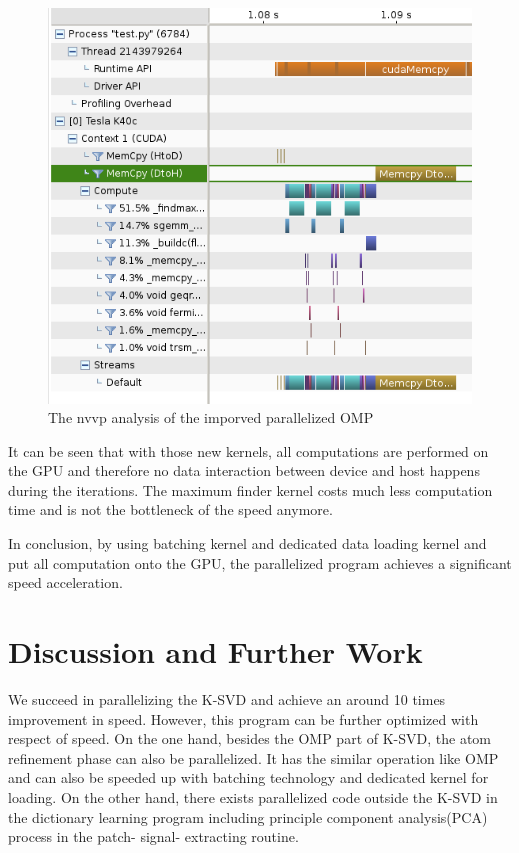 \documentclass[english]{cccconf}
\begin{document}
\begin{figure}[!htb]
	\centering
	\includegraphics[width=400pt]{5.png}
	\caption{The nvvp analysis of the imporved parallelized OMP}
	\label{figh5}
\end{figure} 

It can be seen that with those new kernels, all computations are performed on the GPU and therefore no data interaction between device and host happens during the iterations. The maximum finder kernel costs much less computation time and is not the bottleneck of the speed anymore. 

In conclusion, by using batching kernel and dedicated data loading kernel and put all computation onto the GPU, the parallelized program achieves a significant speed acceleration. 

\section{Discussion and Further Work}
We succeed in parallelizing the K-SVD and achieve an around 10 times improvement in speed. However, this program can be further optimized with respect of speed. On the one hand, besides the OMP part of K-SVD, the atom refinement phase can also be parallelized. It has the similar operation like OMP and can also be speeded up with batching technology and dedicated kernel for loading. On the other hand, there exists parallelized code outside the K-SVD in the dictionary learning program including principle component analysis(PCA) process in the patch- signal- extracting routine.
\end{document}
